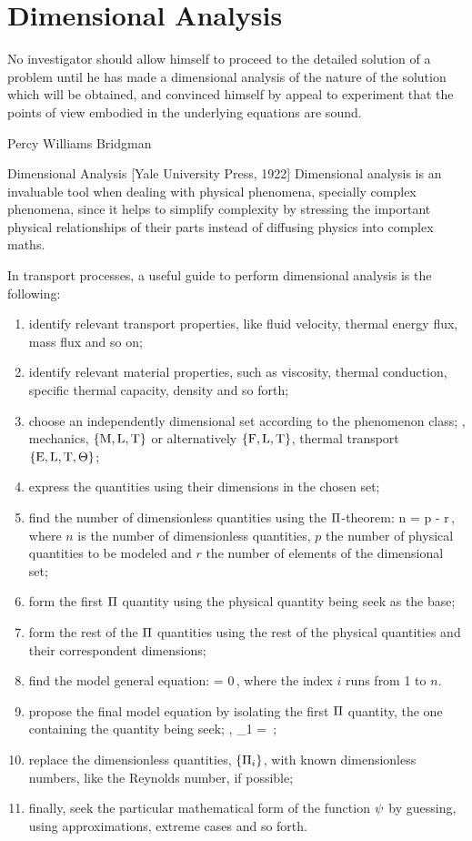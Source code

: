 \section{Dimensional Analysis}
%
\epigraph{No investigator should allow himself to proceed to the detailed solution of a problem until he has made a dimensional analysis of the nature of the solution which will be obtained, and convinced himself by appeal to experiment that the points of view embodied in the underlying equations are sound.}
{Percy Williams Bridgman}{Dimensional Analysis [Yale University Press, 1922]}
%
Dimensional analysis is an invaluable tool when dealing with physical phenomena, specially complex phenomena, since it helps to simplify complexity by stressing the important physical relationships of their parts instead of diffusing physics into complex maths.

In transport processes, a useful guide to perform dimensional analysis is the following:
\begin{enumerate}
\item identify relevant transport properties, like fluid velocity, thermal energy flux, mass flux and so on;
%
\item identify relevant material properties, such as viscosity, thermal conduction, specific thermal capacity, density and so forth;
%
\item choose an independently dimensional set according to the phenomenon class; \ie, mechanics, $\left\lbrace{\text{M}, \text{L}, \text{T}}\right\rbrace$ or alternatively $\left\lbrace{\text{F}, \text{L}, \text{T}}\right\rbrace$, thermal transport $\left\lbrace{\text{E}, \text{L}, \text{T}, \Theta}\right\rbrace$;
%
\item express the quantities using their dimensions in the chosen set;
%
\item find the number of dimensionless quantities using the $\Pi$-theorem:
\beq
n = p - r\,,
\eeq
where $n$ is the number of dimensionless quantities, $p$ the number of physical quantities to be modeled and $r$ the number of elements of the dimensional set;
%
\item form the first $\Pi$ quantity using the physical quantity being seek as the base;
%
\item form the rest of the $\Pi$ quantities using the rest of the physical quantities and their correspondent dimensions;
%
\item find the model general equation:
\beq
\dimfunc{} = 0\,,
\eeq
where the index $i$ runs from 1 to $n$.
%
\item propose the final model equation by isolating the first $\Pi$ quantity, the one containing the quantity being seek; \ie,
\beq
\kdim_1 = \dimfunc{}\,;
\eeq
%
\item replace the dimensionless quantities, $\left\lbrace{\Pi_i}\right\rbrace$, with known dimensionless numbers, like the Reynolds number, if possible;
%
\item finally, seek the particular mathematical form of the function $\psi$ by guessing, using approximations, extreme cases and so forth.
\end{enumerate}

